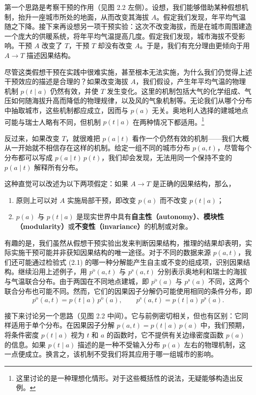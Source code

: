 第一个思路是考察干预的作用（见图 2.2 左侧）。设想，我们能够借助某种假想机制，抬升一座城市所处的地面，从而改变其海拔 $A$。假定我们发现，年平均气温随之下降。接下来再设想另一项干预实验：这次不改变海拔，而是在城市周围建造一个庞大的供暖系统，将年平均气温提高几度。假定我们发现，城市海拔不受影响。干预 $A$ 改变了 $T$，干预 $T$ 却没有改变 $A$。于是，我们有充分理由更倾向于用 $A\to T$ 描述因果结构。

尽管这类假想干预在实践中很难实施，甚至根本无法实施，为什么我们仍觉得上述干预效应的描述是合理的？如果改变海拔 $A$，我们假设，产生年平均气温的物理机制 $p(t\mid a)$ 仍然有效，并使 $T$ 发生变化。这里的机制包括大气的化学组成、气压如何随海拔升高而降低的物理规律，以及风的气象机制等。无论我们从哪个分布中抽取城市，这些机制都应成立，因而与 $p(a)$ 无关。奥地利人选择的建城地点可能与瑞士人略有不同，但机制 $p(t\mid a)$ 在两种情况下都适用。\footnote{这里讨论的是一种理想化情形。对于这些概括性的说法，无疑能够构造出反例。}

反过来，如果改变 $T$，就很难把 $p(a\mid t)$ 看作一个仍然有效的机制——我们大概从一开始就不相信存在这样的机制。给定一组不同的城市分布 $p(a,t)$，尽管每个分布都可以写成 $p(a\mid t)\,p(t)$，我们却会发现，无法用同一个保持不变的 $p(a\mid t)$ 解释所有分布。

这种直觉可以改述为以下两项假定：如果 $A\to T$ 是正确的因果结构，那么，
\begin{enumerate}[label=(\roman*)]
 \item 原则上可以对 $A$ 实施局部干预，即改变 $p(a)$ 而不改变 $p(t\mid a)$；
 \item $p(a)$ 与 $p(t\mid a)$ 是现实世界中具有\textbf{自主性（autonomy）}、\textbf{模块性（modularity）}或\textbf{不变性（invariance）}的机制或对象。
\end{enumerate}

有趣的是，我们虽然从假想干预实验出发来判断因果结构，推理的结果却表明，实际实施干预可能并非获知因果结构的唯一途径。对于不同的数据来源 $p(a,t)$，我们还可能通过检验式 (2.1) 的哪一种分解能产生自主或不变的组成项，识别因果结构。继续沿用上述例子，用 $p^{\ddot{\mathrm{o}}}(a,t)$ 与 $p^{\mathrm{s}}(a,t)$ 分别表示奥地利和瑞士的海拔与气温联合分布。由于两国在不同地点建城，即 $p^{\ddot{\mathrm{o}}}(a)$ 与 $p^{\mathrm{s}}(a)$ 不同，这两个联合分布也可能不同。然而，它们的因果因子分解仍可能使用相同的条件分布，即
\[
 p^{\ddot{\mathrm{o}}}(a,t)=p(t\mid a)\,p^{\ddot{\mathrm{o}}}(a),\qquad
 p^{\mathrm{s}}(a,t)=p(t\mid a)\,p^{\mathrm{s}}(a).
\]

接下来讨论另一个思路（见图 2.2 中间）。它与前例密切相关，但也有区别：它同样适用于单个分布。在因果因子分解 $p(a,t)=p(t\mid a)\,p(a)$ 中，我们预期，将条件密度 $p(t\mid a)$ 视为 $t$ 和 $a$ 的函数时，它不提供有关边缘密度函数 $p(a)$ 的信息。如果 $p(t\mid a)$ 描述的是一种不受输入分布 $p(a)$ 左右的物理机制，这一点便成立。换言之，该机制不受我们将其应用于哪一组城市的影响。

